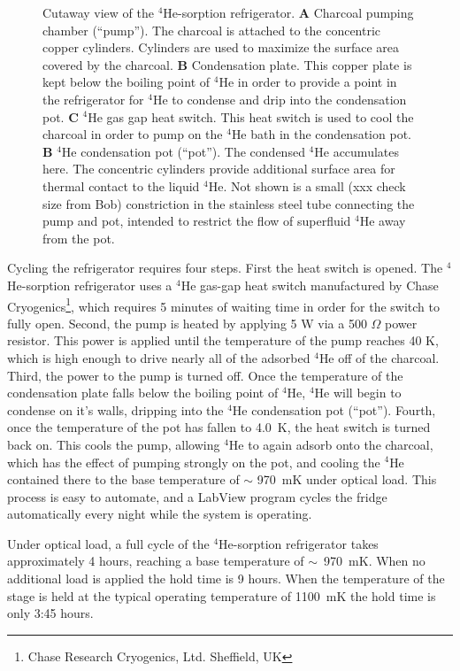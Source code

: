 \documentclass[10pt,twocolumn,article]{memoir}
\newcommand*{\He}[1]{$^{#1}$He\xspace}
\newcommand*{\Ohm}{\ensuremath{\Omega}\xspace}
\begin{document}
\begin{figure}[th]
\caption{Cutaway view of the \He4-sorption refrigerator. \textbf{A} Charcoal pumping chamber (``pump''). The charcoal is attached to the concentric copper cylinders. Cylinders are used to maximize the surface area covered by the charcoal. \textbf{B} Condensation plate. This copper plate is kept below the boiling point of \He4 in order to provide a point in the refrigerator for \He4 to condense and drip into the condensation pot. \textbf{C} \He4 gas gap heat switch. This heat switch is used to cool the charcoal in order to pump on the \He4 bath in the condensation pot. \textbf{B} \He4 condensation pot (``pot''). The condensed \He4 accumulates here. The concentric cylinders provide additional surface area for thermal contact to the liquid \He4. Not shown is a small (xxx check size from Bob) constriction in the stainless steel tube connecting the pump and pot, intended to restrict the flow of superfluid \He4 away from the pot.}
\label{fig:he4sorp}
\end{figure}

Cycling the refrigerator requires four steps.
First the heat switch is opened.
The \He4-sorption refrigerator uses a \He4 gas-gap heat switch manufactured by Chase Cryogenics\footnote{Chase Research Cryogenics, Ltd. Sheffield, UK}, which requires 5 minutes of waiting time in order for the switch to fully open.
Second, the pump is heated by applying 5 W via a 500 \Ohm power resistor.
This power is applied until the temperature of the pump reaches 40 K, which is high enough to drive nearly all of the adsorbed \He4 off of the charcoal.
Third, the power to the pump is turned off.
Once the temperature of the condensation plate falls below the boiling point of \He4, \He4 will begin to condense on it's walls, dripping into the \He4 condensation pot (``pot'').
Fourth, once the temperature of the pot has fallen to 4.0~K, the heat switch is turned back on.
This cools the pump, allowing \He4 to again adsorb onto the charcoal, which has the effect of pumping strongly on the pot, and cooling the \He4 contained there to the base temperature of $\sim$ 970~mK under optical load.
This process is easy to automate, and a LabView program cycles the fridge automatically every night while the system is operating.

Under optical load, a full cycle of the \He4-sorption refrigerator takes approximately 4 hours, reaching a base temperature of $\sim$~970~mK.
When no additional load is applied the hold time is 9 hours.
When the temperature of the stage is held at the typical operating temperature of 1100~mK the hold time is only 3:45 hours.
\end{document}
